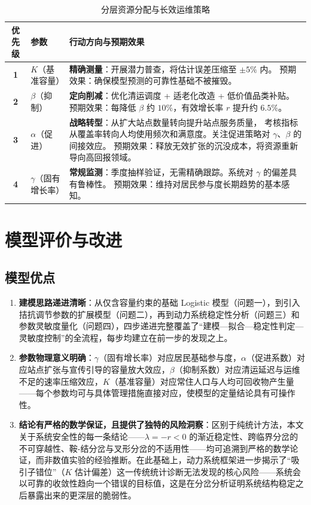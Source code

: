 \documentclass[12pt,a4paper]{ctexart}
\begin{document}
\begin{table}[htbp]
\begin{table}[htbp]
\centering
\caption{分层资源分配与长效运维策略}
\label{tab:resource_allocation}
\begin{tabular}{clp{7cm}}
\toprule
优先级 & 参数 & 行动方向与预期效果 \\
\midrule
\textbf{1} & $K$（基准容量） &
  \textbf{精确测量}：开展潜力普查，将估计误差压缩至 $\pm 5\%$ 内。
  预期效果：确保模型预测的可靠性基础不被摧毁。 \\

\textbf{2} & $\beta$（抑制） &
  \textbf{定向削减}：优化清运调度 + 适老化改造 + 低价值品类补贴。
  预期效果：每降低 $\beta$ 约 $10\%$，有效增长率 $r$ 提升约 $6.5\%$。 \\

\textbf{3} & $\alpha$（促进） &
  \textbf{战略转型}：从扩大站点数量转向提升站点服务质量，
  考核指标从覆盖率转向人均使用频次和满意度。关注促进策略对 $\gamma$、$\beta$ 的间接效应。
  预期效果：释放无效扩张的沉没成本，将资源重新导向高回报领域。 \\

\textbf{4} & $\gamma$（固有增长率） &
  \textbf{常规监测}：季度抽样验证，无需精确跟踪。系统对 $\gamma$ 的偏差具有鲁棒性。
  预期效果：维持对居民参与度长期趋势的基本感知。 \\
\bottomrule
\end{tabular}
\end{table}

\section{模型评价与改进}

\subsection{模型优点}

\begin{enumerate}
    \item \textbf{建模思路递进清晰}：从仅含容量约束的基础 Logistic 模型（问题一），到引入拮抗调节参数的扩展模型（问题二），再到动力系统稳定性分析（问题三）和参数灵敏度量化（问题四），四步递进完整覆盖了``建模—拟合—稳定性判定—灵敏度控制''的全流程，每步均建立在前一步的发现之上。
    \item \textbf{参数物理意义明确}：$\gamma$（固有增长率）对应居民基础参与度，$\alpha$（促进系数）对应站点扩张与宣传引导的容量放大效应，$\beta$（抑制系数）对应清运延迟与运维不足的速率压缩效应，$K$（基准容量）对应常住人口与人均可回收物产生量——每个参数均可与具体管理措施直接对应，使模型的定量结论具有可操作性。
    \item \textbf{结论有严格的数学保证，且提供了独特的风险洞察}：区别于纯统计方法，本文关于系统安全性的每一条结论——$\lambda = -r < 0$ 的渐近稳定性、跨临界分岔的不可穿越性、鞍-结分岔与叉形分岔的不适用性——均可追溯到严格的数学论证，而非数值实验的经验推断。在此基础上，动力系统框架进一步揭示了``吸引子错位''（$K$ 估计偏差）这一传统统计诊断无法发现的核心风险——系统会以可靠的收敛性趋向一个错误的目标值，这是在分岔分析证明系统结构稳定之后暴露出来的更深层的脆弱性。
\end{enumerate}


\end{table}
\end{document}
